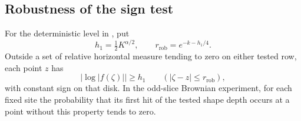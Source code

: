 \subsection{Robustness of the sign test}

\begin{proposition}\label{prop:robust-sign}
For the deterministic level in , put
\begin{equation}\label{sign:h1-radius}
 h_1=\tfrac12K^{\alpha/2},\qquad
 r_{\mathrm{rob}}=e^{-k-h_1/4}.
\end{equation}
Outside a set of relative horizontal measure tending to zero on
either tested row, each point \(z\) has
\[
 |\log|f(\zeta)||\ge h_1
       \qquad (|\zeta-z|\le r_{\mathrm{rob}}),
\]
with constant sign on that disk.  In the odd-slice Brownian
experiment, for each fixed site the probability that its first hit
of the tested shape depth occurs at a point without this property
tends to zero.
\end{proposition}

